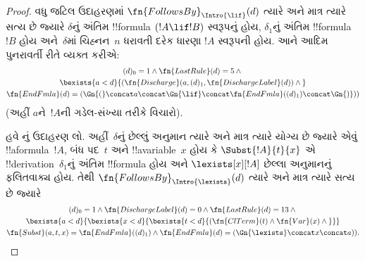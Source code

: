 \documentclass[../../../include/open-logic-section]{subfiles}
\begin{document}
\begin{proof}
  વધુ જટિલ ઉદાહરણમાં
  $\fn{FollowsBy}_{\Intro{\lif}}(d)$
  ત્યારે અને માત્ર ત્યારે સત્ય છે જ્યારે
  $\delta$નું અંતિમ !!{formula}
  $(!A \lif !B)$ સ્વરૂપનું હોય,
  $\delta_1$નું અંતિમ !!{formula}~$!B$
  હોય અને~$\delta$માં ચિહ્નન~$n$
  ધરાવતી દરેક ધારણા $!A$ સ્વરૂપની હોય.
  આને આદિમ પુનરાવર્તી રીતે વ્યક્ત કરીએ:
  \begin{multline*}
    (d)_0 = 1 \land \fn{LastRule}(d) = 5 \land {}\\
    \bexists{a<d}{(\fn{Discharge}(a, (d)_1, \fn{DischargeLabel}(d)) \land {}}\\
      \fn{EndFmla}(d) = (\Gn{(} \concat a \concat \Gn{\lif}
      \concat \fn{EndFmla}((d)_1) \concat \Gn{)}))
  \end{multline*}
  (અહીં $a$ને~$!A$ની ગડેલ-સંખ્યા
  તરીકે વિચારો).

  હવે \Intro{\lexists}નું ઉદાહરણ લો.
  અહીં~$\delta$નું છેલ્લું અનુમાન
  ત્યારે અને માત્ર ત્યારે યોગ્ય છે
  જ્યારે એવું !!a{formula}~$!A$,
  બંધ પદ~$t$ અને !!a{variable}~$x$
  હોય કે $\Subst{!A}{t}{x}$ એ
  !!{derivation}~$\delta_1$નું અંતિમ
  !!{formula} હોય અને
  $\lexists[x][!A]$ છેલ્લા અનુમાનનું
  ફલિતવાક્ય હોય. તેથી
  $\fn{FollowsBy}_{\Intro{\lexists}}(d)$
  ત્યારે અને માત્ર ત્યારે સત્ય છે જ્યારે
  \begin{multline*}
    (d)_0 = 1 \land \fn{DischargeLabel}(d) = 0 \land
    \fn{LastRule}(d) = 13 \land {} \\
    \bexists{a < d}{\bexists{x<d}{\bexists{t<d}{
          (\fn{ClTerm}(t) \land \fn{Var}(x)  \land {}}}}\\
    \fn{Subst}(a,t,x) = \fn{EndFmla}((d)_1) \land
    \fn{EndFmla}(d) = (\Gn{\lexists} \concat x \concat a)).
  \end{multline*}


\end{proof}
\end{document}

